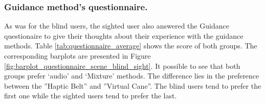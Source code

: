 \subsubsection{Guidance method's questionnaire.}
\label{subsubsec:results_questionnaires_2}

As was for the blind users, the sighted user also answered the Guidance questionaire to give their thoughts about their experience with the guidance methods. Table \ref{tab:questionnaire_average} shows the score of both groups. The corresponding barplots are presented in Figure \ref{fig:barplot_questionnaire_scene_blind_sight}. It possible to see that both groups prefer ‘audio’  and ‘Mixture’ methods. The difference lies in the preference between the ”Haptic Belt” and ”Virtual Cane”. The blind users tend to prefer the first one while the sighted users tend to prefer the last.



